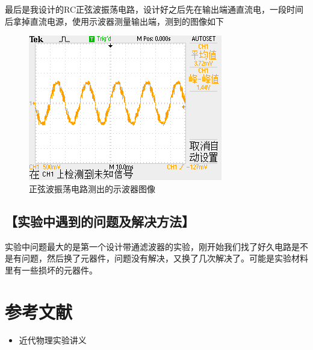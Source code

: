 \documentclass{ctexart}
\let\oldsubsection\subsection
\renewcommand{\subsection}[1]{\oldsubsection{\!\!\!\!\!\!【#1】}}
\begin{document}
最后是我设计的RC正弦波振荡电路，设计好之后先在输出端通直流电，一段时间后拿掉直流电源，使用示波器测量输出端，测到的图像如下

\begin{figure}[H]
  \centering
  \includegraphics[width=0.75\linewidth]{电路图像/正弦波振荡电路/正弦波电路振荡图}
  \caption{正弦波振荡电路测出的示波器图像}
\end{figure}

\subsection{实验中遇到的问题及解决方法}

实验中问题最大的是第一个设计带通滤波器的实验，刚开始我们找了好久电路是不是有问题，然后换了元器件，问题没有解决，又换了几次解决了。可能是实验材料里有一些损坏的元器件。

\section{参考文献}
\begin{itemize}[leftmargin=0pt]
  \item[] 近代物理实验讲义
\end{itemize}
\end{document}
